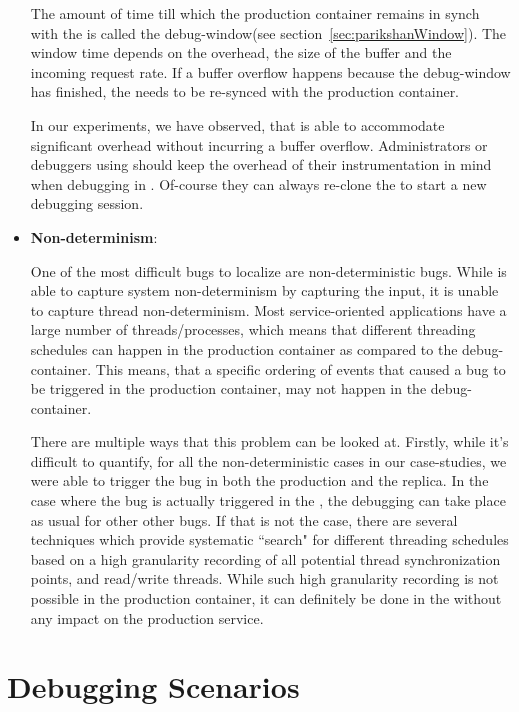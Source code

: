\begin{itemize}
	The amount of time till which the production container remains in synch with the \debugcontainer is called the debug-window(see section~\ref{sec:parikshanWindow}). The window time depends on the overhead, the size of the buffer and the incoming request rate. If a buffer overflow happens because the debug-window has finished, the \debugcontainer needs to be re-synced with the production container.
	
	In our experiments, we have observed, that \parikshan is able to accommodate significant overhead without incurring a buffer overflow.	
	Administrators or debuggers using \parikshan should keep the overhead of their instrumentation in mind when debugging in \parikshan. Of-course they can always re-clone the \productioncontainer to start a new debugging session.
	
	\item \textbf{Non-determinism}:
	
	One of the most difficult bugs to localize are non-deterministic bugs. While \parikshan is able to capture system non-determinism by capturing the input, it is unable to capture thread non-determinism. Most service-oriented applications have a large number of threads/processes, which means that different threading schedules can happen in the production container as compared to the debug-container.
	This means, that a specific ordering of events that caused a bug to be triggered in the production container, may not happen in the debug-container.
	
	There are multiple ways that this problem can be looked at. Firstly, while it's difficult to quantify, for all the non-deterministic cases in our case-studies, we were able to trigger the bug in both the production and the replica. 
	In the case where the bug is actually triggered in the \debugcontainer, the debugging can take place as usual for other other bugs.
	If that is not the case, there are several techniques which provide systematic ``search" for different threading schedules based on a high granularity recording of all potential thread synchronization points, and read/write threads. While such high granularity recording is not possible in the production container, it can definitely be done in the \debugcontainer without any impact on the production service.
	
\end{itemize}

\section{Debugging Scenarios}
\label{sec:activeDebuggingScenarios}

